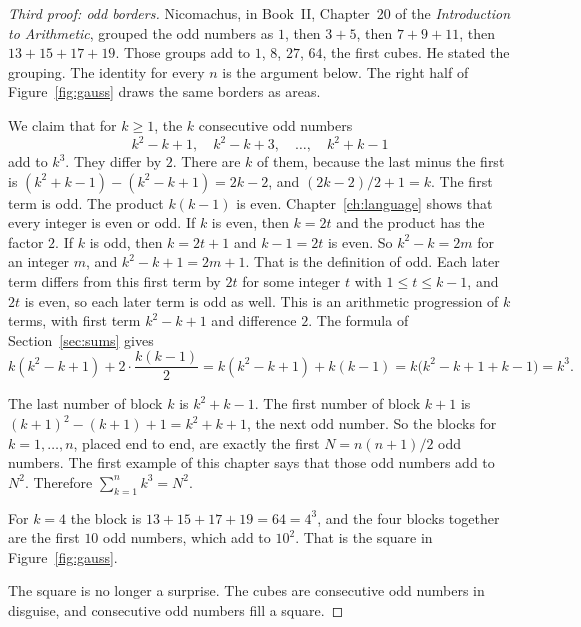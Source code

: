 \begin{proof}[Third proof: odd borders]
Nicomachus, in Book~II, Chapter~20 of the \emph{Introduction to Arithmetic}, grouped the odd numbers as $1$, then $3+5$, then $7+9+11$, then $13+15+17+19$. Those groups add to $1$, $8$, $27$, $64$, the first cubes. He stated the grouping. The identity for every $n$ is the argument below. The right half of Figure~\ref{fig:gauss} draws the same borders as areas.

We claim that for $k\ge1$, the $k$ consecutive odd numbers
\[
k^2-k+1,\quad k^2-k+3,\quad \dots,\quad k^2+k-1
\]
add to $k^3$. They differ by $2$. There are $k$ of them, because the last minus the first is $(k^2+k-1)-(k^2-k+1)=2k-2$, and $(2k-2)/2+1=k$. The first term is odd. The product $k(k-1)$ is even. Chapter~\ref{ch:language} shows that every integer is even or odd. If $k$ is even, then $k=2t$ and the product has the factor $2$. If $k$ is odd, then $k=2t+1$ and $k-1=2t$ is even. So $k^2-k=2m$ for an integer $m$, and $k^2-k+1=2m+1$. That is the definition of odd. Each later term differs from this first term by $2t$ for some integer $t$ with $1\le t\le k-1$, and $2t$ is even, so each later term is odd as well. This is an arithmetic progression of $k$ terms, with first term $k^2-k+1$ and difference $2$. The formula of Section~\ref{sec:sums} gives
\[
k(k^2-k+1)+2\cdot\frac{k(k-1)}{2}=k(k^2-k+1)+k(k-1)=k\bigl(k^2-k+1+k-1\bigr)=k^3.
\]

The last number of block $k$ is $k^2+k-1$. The first number of block $k+1$ is $(k+1)^2-(k+1)+1=k^2+k+1$, the next odd number. So the blocks for $k=1,\dots,n$, placed end to end, are exactly the first $N=n(n+1)/2$ odd numbers. The first example of this chapter says that those odd numbers add to $N^2$. Therefore $\sum_{k=1}^n k^3=N^2$.

For $k=4$ the block is $13+15+17+19=64=4^3$, and the four blocks together are the first $10$ odd numbers, which add to $10^2$. That is the square in Figure~\ref{fig:gauss}.

The square is no longer a surprise. The cubes are consecutive odd numbers in disguise, and consecutive odd numbers fill a square.
\end{proof}

